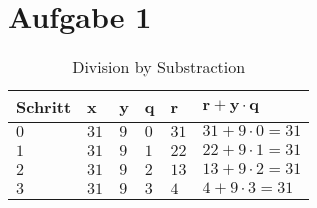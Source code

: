 \documentclass[a4paper]{article}
\begin{document}
\section*{Aufgabe 1}

\begin{table}[h]
\caption{Division by Substraction}
\label{bookmarksavepage}\centering
\begin{tabularx}{\textwidth}{XXXXXX}
\toprule
\textbf{Schritt} & \textbf{x} & \textbf{y} & \textbf{q} & \textbf{r} & $\mathbf{r+y\cdot q}$ \\\toprule
$0$ & $31$ & $9$ & $0$ & $31$ & $31+9\cdot 0 = 31$ \\\midrule
$1$ & $31$ & $9$ & $1$ & $22$ & $22+9\cdot 1 = 31$ \\\midrule
$2$ & $31$ & $9$ & $2$ & $13$ & $13+9\cdot 2 = 31$ \\\midrule
$3$ & $31$ & $9$ & $3$ & $4 $ & $4 +9\cdot 3 = 31$ \\\midrule

\end{tabularx}
\end{table}






\end{document}
